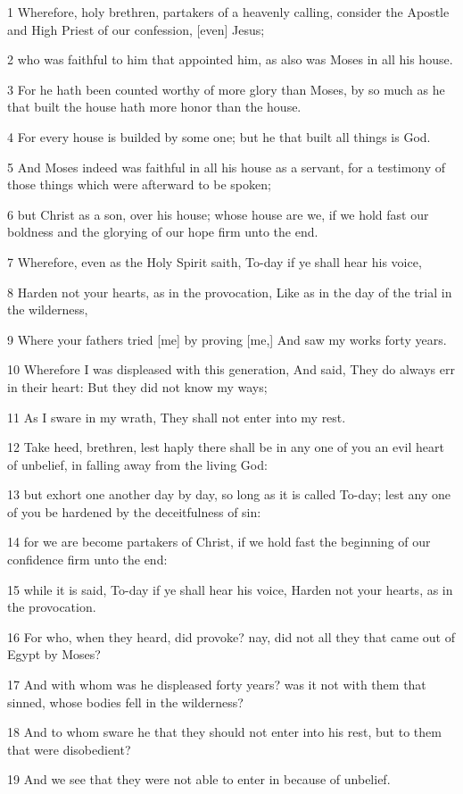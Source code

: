 \par 1 Wherefore, holy brethren, partakers of a heavenly calling, consider the Apostle and High Priest of our confession, [even] Jesus;
\par 2 who was faithful to him that appointed him, as also was Moses in all his house.
\par 3 For he hath been counted worthy of more glory than Moses, by so much as he that built the house hath more honor than the house.
\par 4 For every house is builded by some one; but he that built all things is God.
\par 5 And Moses indeed was faithful in all his house as a servant, for a testimony of those things which were afterward to be spoken;
\par 6 but Christ as a son, over his house; whose house are we, if we hold fast our boldness and the glorying of our hope firm unto the end.
\par 7 Wherefore, even as the Holy Spirit saith, To-day if ye shall hear his voice,
\par 8 Harden not your hearts, as in the provocation, Like as in the day of the trial in the wilderness,
\par 9 Where your fathers tried [me] by proving [me,] And saw my works forty years.
\par 10 Wherefore I was displeased with this generation, And said, They do always err in their heart: But they did not know my ways;
\par 11 As I sware in my wrath, They shall not enter into my rest.
\par 12 Take heed, brethren, lest haply there shall be in any one of you an evil heart of unbelief, in falling away from the living God:
\par 13 but exhort one another day by day, so long as it is called To-day; lest any one of you be hardened by the deceitfulness of sin:
\par 14 for we are become partakers of Christ, if we hold fast the beginning of our confidence firm unto the end:
\par 15 while it is said, To-day if ye shall hear his voice, Harden not your hearts, as in the provocation.
\par 16 For who, when they heard, did provoke? nay, did not all they that came out of Egypt by Moses?
\par 17 And with whom was he displeased forty years? was it not with them that sinned, whose bodies fell in the wilderness?
\par 18 And to whom sware he that they should not enter into his rest, but to them that were disobedient?
\par 19 And we see that they were not able to enter in because of unbelief.

